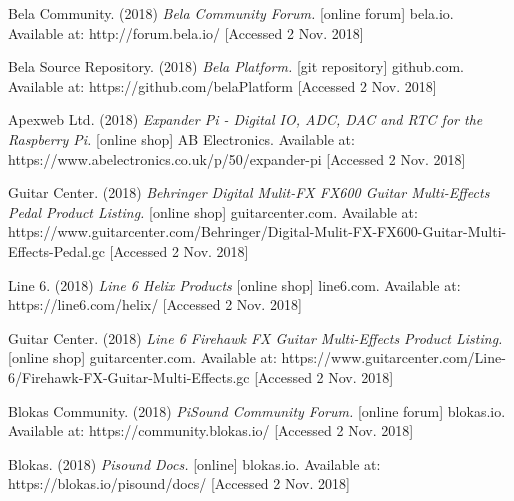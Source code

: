 \documentclass[journal,onecolumn,draftclsnofoot]{IEEEtran}
\begin{document}
\begin{thebibliography}{1}
Bela Community. (2018) \textit{Bela Community Forum.} [online forum] bela.io. Available at: http://forum.bela.io/ [Accessed 2 Nov. 2018]

Bela Source Repository. (2018) \textit{Bela Platform.} [git repository] github.com. Available at: https://github.com/belaPlatform [Accessed 2 Nov. 2018]

Apexweb Ltd. (2018) \textit{Expander Pi - Digital IO, ADC, DAC and RTC for the Raspberry Pi.} [online shop] AB Electronics. Available at: https://www.abelectronics.co.uk/p/50/expander-pi [Accessed 2 Nov. 2018]

Guitar Center. (2018) \textit{Behringer Digital Mulit-FX FX600 Guitar Multi-Effects Pedal Product Listing.} [online shop] guitarcenter.com. Available at: https://www.guitarcenter.com/Behringer/Digital-Mulit-FX-FX600-Guitar-Multi-Effects-Pedal.gc [Accessed 2 Nov. 2018]

Line 6. (2018) \textit{Line 6 Helix Products} [online shop] line6.com. Available at: https://line6.com/helix/ [Accessed 2 Nov. 2018]

Guitar Center. (2018) \textit{Line 6 Firehawk FX Guitar Multi-Effects Product Listing.} [online shop] guitarcenter.com. Available at:  https://www.guitarcenter.com/Line-6/Firehawk-FX-Guitar-Multi-Effects.gc [Accessed 2 Nov. 2018]

Blokas Community. (2018) \textit{PiSound Community Forum.} [online forum] blokas.io. Available at: https://community.blokas.io/ [Accessed 2 Nov. 2018]

Blokas. (2018) \textit{Pisound Docs.} [online] blokas.io. Available at: https://blokas.io/pisound/docs/ [Accessed 2 Nov. 2018]
\end{thebibliography}
\end{document}
